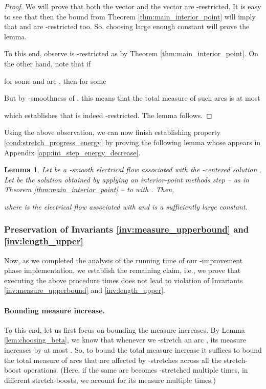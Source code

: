 \documentclass[11pt, letterpaper]{article}
\newtheorem{lemma}[theorem]{Lemma}
\begin{document}
\begin{proof}
We will prove that both the vector  and the vector  are -restricted. It is easy to see that then the bound from Theorem \ref{thm:main_interior_point} will imply that  and  are -restricted too. So, choosing large enough constant  will prove the lemma.

To this end, observe  is -restricted as  by Theorem \ref{thm:main_interior_point}. On the other hand, note that if

 for some  and arc , then  for some 
 
But by -smoothness of , this means that the total measure of such arcs is at most

which establishes that  is indeed -restricted. The lemma follows.
\end{proof}

Using the above observation, we can now finish establishing property \eqref{cond:stretch_progress_energy} by proving the following lemma whose appears in Appendix \ref{app:int_step_energy_decrease}.
\begin{lemma}
\label{lem:int_step_energy_decrease}
Let  be a -smooth electrical flow associated with the -centered solution . Let  be the solution obtained by applying an interior-point methods step -- as in Theorem \ref{thm:main_interior_point} -- to  with . Then, 

where  is the electrical flow associated with  and  is a sufficiently large constant. 
\end{lemma}




\subsubsection*{Preservation of Invariants \ref{inv:measure_upperbound} and \ref{inv:length_upper}}


Now, as we completed the analysis of the running time of our -improvement phase implementation, we establish the remaining claim, i.e., we prove that executing the above procedure  times does not lead to violation of Invariants \ref{inv:measure_upperbound} and \ref{inv:length_upper}. 

\paragraph{Bounding measure increase.}

To this end, let us first focus on bounding the measure increases. By Lemma \ref{lem:choosing_beta}, we know that whenever we -stretch an arc , its measure increases by at most . So, to bound the total measure increase it suffices to bound the total measure of arcs that are affected by -stretches across all the stretch-boost operations. (Here, if the same arc becomes -stretched multiple times, in different stretch-boosts, we account for its measure multiple times.) 
\end{document}
